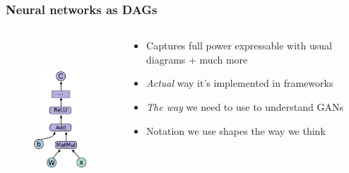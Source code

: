\documentclass{Bredelebeamer}
\begin{document}
\begin{frame}
	\frametitle{Neural networks as DAGs}
	\begin{columns}
		\begin{column}{0.4\textwidth}
	\begin{figure}[h!]
	\centering
	\includegraphics[height=6cm]{comp_graph.png}
	\end{figure}
		\end{column}
		\begin{column}{0.6\textwidth}
	\begin{itemize}[<+->]
		\item Captures full power expressable with usual diagrams + much more
		\item \textit{Actual} way it's implemented in frameworks
		\item \textit{The way} we need to use to understand GANs
		\item Notation we use shapes the way we think
	\end{itemize}
		\end{column}
	\end{columns}
\end{frame}

\end{document}

